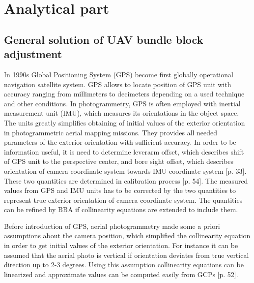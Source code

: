 \documentclass[a4paper,12pt]{article}
\begin{document}
\section{Analytical part}

\subsection{General solution of UAV bundle block adjustment}
\label{sec:solution}


In 1990s Global Positioning System (GPS) become first globally operational navigation satellite system.
GPS allows 
to locate position of GPS unit with accuracy ranging  from  millimeters to decimeters depending 
on a used technique and other conditions. 
In photogrammetry, GPS is often employed with inertial measurement unit (IMU), which measures its orientations in the object space.
The units greatly simplifies obtaining of initial values of the exterior orientation in photogrammetric aerial mapping missions.
They provides all needed parameters of the exterior orientation with sufficient accuracy. 
In order to be information useful, it is need to determine 
leverarm offset, which describes shift of GPS unit to the perspective center, and bore sight offset,
which describes orientation of camera coordinate system towards IMU coordinate system \cite{perry2009synthesized}[p. 33]. These two
quantities are determined in calibration process \cite{perry2009synthesized}[p. 54]. The measured values from GPS and IMU units has to
be corrected by the two quantities to represent true exterior orientation of camera coordinate system. The quantities
can be refined by BBA if collinearity equations are extended to include them.

\label{sec:assum}
Before introduction of GPS, aerial photogrammetry made some a priori assumptions about the camera position,
which simplified the collinearity equation in order to get initial values of the exterior orientation. 
For instance it can be assumed that the aerial photo is vertical if orientation deviates from true vertical
direction up to 2-3 degrees. Using this assumption collinearity equations can be linearized and 
approximate values can be computed easily from GCPs \cite{pavelka2004foto20}[p. 52].
\end{document}

